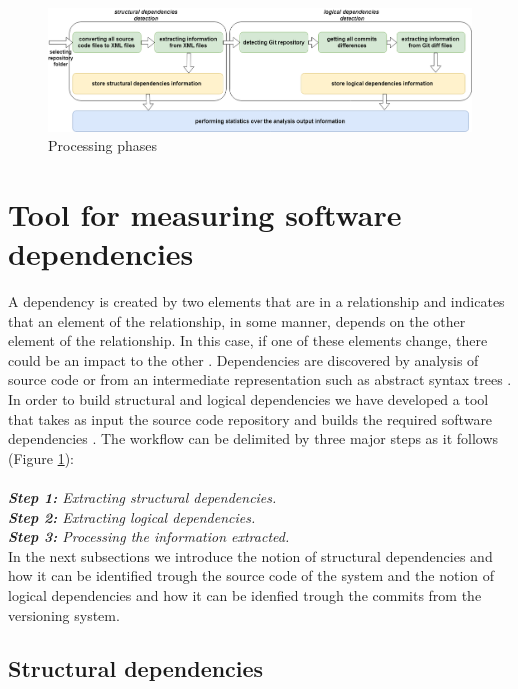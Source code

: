 \documentclass[conference,compsoc]{IEEEtran}
\begin{document}
\begin{figure}[h]
\centering
\includegraphics[width=\textwidth]{fig3.png}
\caption{Processing phases}
\label{fig:fig3}
\end{figure}
\section{Tool for measuring software dependencies}
 A dependency is created by two elements that are in a relationship and indicates that an element of the relationship, in some manner, depends on the other element of the relationship. In this case, if one of these elements change, there could be an impact to the other \cite{ct2}. Dependencies are discovered by analysis of source code or from an intermediate representation such as abstract syntax trees \cite{ct3} .\\
In order to build structural and logical dependencies we have developed a tool that takes as input the source code repository and builds the required software dependencies . The workflow can be delimited by three major steps as it follows (Figure \ref{fig:fig3}):\\ \\
\textit{\textbf{Step 1:} Extracting structural dependencies.}\\
\textit{\textbf{Step 2:} Extracting logical dependencies.}\\
\textit{\textbf{Step 3:} Processing the information extracted.}\\


In the next subsections we introduce the notion of structural dependencies and how it can be identified trough the source code of the system and the notion of logical dependencies and how it can be idenfied trough the commits from the versioning system.

\subsection{ Structural dependencies}
\end{document}
